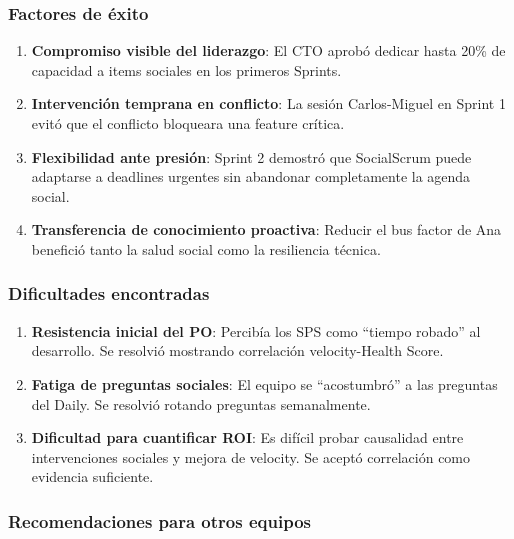 \subsubsection{Factores de éxito}

\begin{enumerate}
    \item \textbf{Compromiso visible del liderazgo}: El CTO aprobó dedicar hasta 20\% de capacidad a items sociales en los primeros Sprints.

    \item \textbf{Intervención temprana en conflicto}: La sesión Carlos-Miguel en Sprint 1 evitó que el conflicto bloqueara una feature crítica.

    \item \textbf{Flexibilidad ante presión}: Sprint 2 demostró que SocialScrum puede adaptarse a deadlines urgentes sin abandonar completamente la agenda social.

    \item \textbf{Transferencia de conocimiento proactiva}: Reducir el bus factor de Ana benefició tanto la salud social como la resiliencia técnica.
\end{enumerate}

\subsubsection{Dificultades encontradas}

\begin{enumerate}
    \item \textbf{Resistencia inicial del PO}: Percibía los SPS como ``tiempo robado'' al desarrollo. Se resolvió mostrando correlación velocity-Health Score.

    \item \textbf{Fatiga de preguntas sociales}: El equipo se ``acostumbró'' a las preguntas del Daily. Se resolvió rotando preguntas semanalmente.

    \item \textbf{Dificultad para cuantificar ROI}: Es difícil probar causalidad entre intervenciones sociales y mejora de velocity. Se aceptó correlación como evidencia suficiente.
\end{enumerate}

\subsubsection{Recomendaciones para otros equipos}

